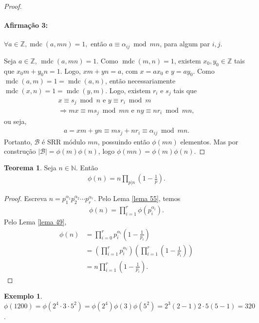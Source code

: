 \documentclass[a4paper,11pt,twoside, leqno]{article}
\DeclareMathOperator{\mdc}{mdc}
\theoremstyle{definition}
\newtheorem{theorem}{Teorema}[section]
\newtheorem*{example}{Exemplo}
\begin{document}
\begin{proof}
	\paragraph{Afirmação 3:} $\forall a\in\mathbb{Z},\mdc(a,mn) = 1,$ então $ a\equiv \alpha_{ij}\bmod mn$, para algum par $i,j$.
	\par\vspace{0.3cm} Seja $a\in\mathbb{Z}$, $\mdc(a,mn) = 1$. Como $\mdc(m,n) = 1$, existem $x_0, y_0\in\mathbb{Z}$ tais que $x_0m + y_0n = 1$. Logo, $xm + yn = a$, com $x = ax_0$ e $y = ay_0$. Como $\mdc(a,m) = 1 = \mdc(a,n)$, então necessariamente $\mdc(x,n) = 1 = \mdc(y,m)$. Logo, existem $r_i$ e $s_j$ tais que
	\begin{align*}
	x\equiv s_j\bmod n \text{ e } y\equiv r_i\bmod m \\
	\Rightarrow mx\equiv ms_j\bmod mn \text{ e } ny\equiv nr_i\bmod mn,
	\end{align*}
	ou seja,
	\begin{align*}
	a = xm + yn \equiv ms_j + nr_i \equiv \alpha_{ij} \bmod mn.
	\end{align*}
	Portanto, $\mathcal{B}$ é SRR módulo $mn$, possuindo então $\phi(mn)$ elementos. Mas por construção $|\mathcal{B}| = \phi(m)\phi(n)$, logo $\phi(mn) = \phi(m)\phi(n)$.
\end{proof}
\begin{theorem}
	Seja $n\in\mathbb{N}$. Então
	\begin{align*}
	\phi(n) = n\prod_{p|n}\left(1 - \frac{1}{p}\right).
	\end{align*}
\end{theorem}
\begin{proof}
	Escreva $n = p_1^{\alpha_1}p_2^{\alpha_2}\cdots p_r^{\alpha_r}$. Pelo Lema \eqref{lema 55}, temos
	\begin{align*}
	\phi(n) = \prod_{i=1}^{r}\phi(p_i^{\alpha_i}).
	\end{align*}
	Pelo Lema \eqref{lema 49},
	\begin{align*}
	\phi(n) &= \prod_{i=0}^{r}p_i^{\alpha_i}\left( 1 - \frac{1}{p_i} \right) \\
	&= \left( \prod_{i=1}^{r}p_i^{\alpha_i} \right)\left( \prod_{i=1}^{r} \left( 1 - \frac{1}{p_i} \right) \right) \\
	&= n\prod_{i=1}^{r}\left(1 - \frac{1}{p_i}\right).
	\end{align*}
\end{proof}
\begin{example}
	$\phi(1200) = \phi(2^4\cdot 3\cdot 5^2) = \phi(2^4)\phi(3)\phi(5^2) = 2^3(2-1)2\cdot 5(5-1) = 320$.
\end{example}
\end{document}
